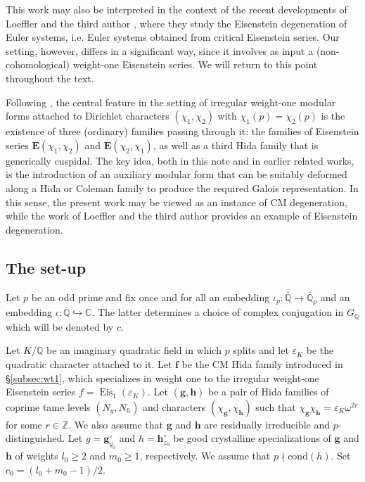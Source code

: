 \documentclass[a4paper,11pt]{amsart}
\theoremstyle{plain}
\theoremstyle{definition}
\theoremstyle{remark}
\newcommand{\bb}{\mathbb}
\DeclareMathOperator{\Eis}{Eis}
\newcommand{\Q}{\mathbb{Q}}
\newcommand{\hE}{{\mathbf{E}}}
\newcommand{\hf}{{\mathbf{f}}}
\newcommand{\hg}{{\mathbf{g}}}
\newcommand{\hh}{{\mathbf h}}
\numberwithin{equation}{section}
\begin{document}
This work may also be interpreted in the context of the recent developments of Loeffler and the third author \cite{LR1}, where they study the Eisenstein degeneration of Euler systems, i.e. Euler systems obtained from critical Eisenstein series. Our setting, however, differs in a significant way, since it involves as input a (non-cohomological) weight-one Eisenstein series. We will return to this point throughout the text.

Following \cite{BeDiPo}, the central feature in the setting of irregular weight-one modular forms attached to Dirichlet characters $(\chi_1,\chi_2)$ with $\chi_1(p)=\chi_2(p)$ is the existence of three (ordinary) families passing through it: the families of Eisenstein series $\hE(\chi_1,\chi_2)$ and $\hE(\chi_2,\chi_1)$, as well as a third Hida family that is generically cuspidal. The key idea, both in this note and in earlier related works, is the introduction of an auxiliary modular form that can be suitably deformed along a Hida or Coleman family to produce the required Galois representation. In this sense, the present work may be viewed as an instance of CM degeneration, while the work of Loeffler and the third author provides an example of Eisenstein degeneration.

\subsection{The set-up}

Let $p$ be an odd prime and fix once and for all an embedding $\iota_p:\overline{\bb{Q}}\xrightarrow{} \overline{\bb{Q}}_p$ and an embedding $\iota: \overline{\bb{Q}}\hookrightarrow \bb{C}$. The latter determines a choice of complex conjugation in $G_{\bb{Q}}$ which will be denoted by $c$.

Let $K/\Q$ be an imaginary quadratic field in which $p$ splits and let $\varepsilon_K$ be the quadratic character attached to it. Let $\hf$ be the CM Hida family introduced in \S\ref{subsec:wt1}, which specializes in weight one to the irregular weight-one Eisenstein series $f = \Eis_1(\varepsilon_K)$. Let $(\hg,\hh)$ be a pair of Hida families of coprime tame levels $(N_g,N_h)$ and characters $(\chi_\hg,\chi_\hh)$ such that $\chi_\hg \chi_\hh =\varepsilon_K \omega^{2r}$ for some $r\in \bb{Z}$. We also assume that $\hg$ and $\hh$ are residually irreducible and $p$-distinguished. Let $g=\hg_{y_0}^\circ$ and $h=\hh_{z_0}^\circ$ be good crystalline specializations of $\hg$ and $\hh$ of weights $l_0\geq 2$ and $m_0\geq 1$, respectively. We assume that $p\nmid \mathrm{cond}(h)$. Set $c_0=(l_0+m_0-1)/2$.
\end{document}
